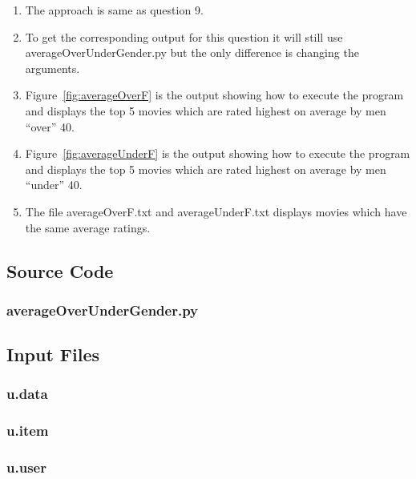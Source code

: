 \documentclass[12pt]{article}
\begin{document}
\begin{enumerate}
    \item The approach is same as question 9.
     
    \item To get the corresponding output for this question it will still use averageOverUnderGender.py but the only difference is  changing the arguments.  
      
     \item  Figure~\ref{fig:averageOverF} is the output showing how to execute the program and displays the top 5 movies which are rated highest on average by men ``over'' 40.
    \item  Figure~\ref{fig:averageUnderF} is the output showing how to execute the program and displays the top 5 movies which are rated highest on average by men ``under'' 40.
       \item  The file averageOverF.txt and averageUnderF.txt displays movies which have the same average ratings.
    
\end{enumerate}

\newpage
\subsection{Source Code}
\subsubsection{averageOverUnderGender.py}

\newpage
\subsection{Input Files}
\subsubsection{u.data}

\subsubsection{u.item}

\subsubsection{u.user}

\newpage
\end{document}

